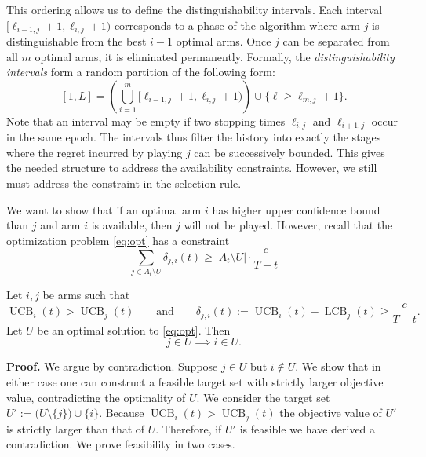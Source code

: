 \documentclass[opre,blindrev]{informs3}
\newcommand{\UCB}{\operatorname{UCB}}
\newcommand{\LCB}{\operatorname{LCB}}
\begin{document}
\begin{APPENDICES}
This ordering allows us to define the distinguishability intervals. Each interval \([\ell_{i-1,j}+1, \ell_{i,j}+1)\) corresponds to a phase of the algorithm where arm \(j\) is distinguishable from the best \(i-1\) optimal arms. Once \(j\) can be separated from all \(m\) optimal arms, it is eliminated permanently. Formally, the \emph{distinguishability intervals} form a random partition of the following form:
\[
[1,L]=\left(\bigcup_{i=1}^m [\ell_{i-1,j}+1, \ell_{i,j}+1)\right)\cup \{\ell\geq \ell_{m,j}+1\}.
\]
Note that an interval may be empty if two stopping times \(\ell_{i,j}\) and \(\ell_{i+1,j}\) occur in the same epoch. The intervals thus filter the history into exactly the stages where the regret incurred by playing \(j\) can be successively bounded. This gives the needed structure to address the availability constraints. However, we still must address the constraint in the selection rule.

We want to show that if an optimal arm \(i\) has higher upper confidence bound than \(j\) and arm \(i\) is available, then \(j\) will not be played. However, recall that the optimization problem \eqref{eq:opt} has a constraint 
\[\sum_{j\in A_t\setminus U}\delta_{j,i}(t)\geq |A_t\setminus U|\cdot \frac{c}{T-t}\]


\begin{lemma}
\label{lem:monotonicity-selection}
    Let \(i,j\) be arms such that
    \[
    \UCB_i(t)>\UCB_j(t)
    \qquad\text{and}\qquad
    \delta_{j,i}(t):=\UCB_i(t)-\LCB_j(t)\ge \frac{c}{T-t}.
    \]
    Let \(U\) be an optimal solution to \eqref{eq:opt}. Then
    \[
    j\in U \implies  i\in U.
    \]
\end{lemma}

\noindent\textbf{Proof.}
    We argue by contradiction. Suppose \(j\in U\) but \(i\notin U\). We show that in either case one can construct a feasible target set with strictly larger objective value, contradicting the optimality of \(U\). We consider the target set \(U' := \bigl(U\setminus\{j\}\bigr)\cup\{i\}\). Because \(\UCB_i(t)>\UCB_j(t)\) the objective value of \(U'\) is strictly larger than that of \(U\). Therefore, if \(U'\) is feasible we have derived a contradiction. We prove feasibility in two cases.
    

\end{APPENDICES}
\end{document}
